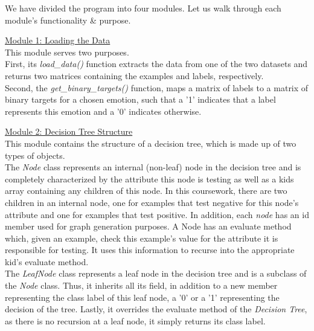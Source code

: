 We have divided the program into four modules. Let us walk through each module's functionality \& purpose.

\underline{Module 1: Loading the Data} \\
This module serves two purposes.\\
First, its \emph{load\_data()} function extracts the data from one of the two datasets
and returns two matrices containing the examples and labels, respectively. \\
Second, the  \emph{get\_binary\_targets()} function, maps a matrix of labels to a matrix of binary targets for a chosen emotion,
such that a '1' indicates that a label represents this emotion and a '0' indicates otherwise.

\underline{Module 2: Decision Tree Structure} \\
This module contains the structure of a decision tree, which is made up of two types of objects. \\
The \emph{Node} class represents an internal (non-leaf) node in the decision tree and is completely characterized by the attribute
this node is testing as well as a kids array containing any children of this node. In this coursework, there are two children
in an internal node, one for examples that test negative for this node's attribute and one for examples that test positive.
In addition, each \emph{node} has an id member used for graph generation purposes.
A Node has an evaluate method which, given an example, check this example's value for the attribute it is responsible for testing.
It uses this information to recurse into the appropriate kid's evaluate method. \\
The \emph{LeafNode} class represents a leaf node in the decision tree and is a subclass of the \emph{Node} class.
Thus, it inherits all its field, in addition to a new member representing the class label of this leaf node,
a '0' or a '1' representing the decision of the tree.
Lastly, it overrides the evaluate method of the \emph{Decision Tree}, as there is no recursion at a leaf node, it simply returns its class label.\\


